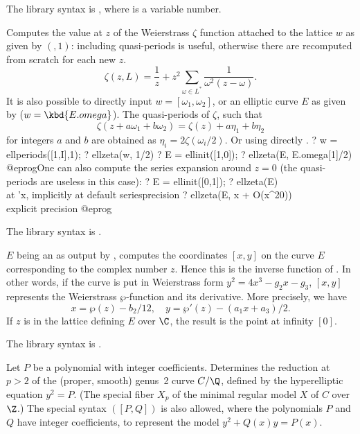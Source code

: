 The library syntax is , where  is a variable number.

\label{se:ellzeta}
Computes the value at $z$ of the Weierstrass $\zeta$ function attached to
the lattice $w$ as given by $(,1)$: including quasi-periods
is useful, otherwise there are recomputed from scratch for each new $z$.
$$ \zeta(z, L) = \dfrac{1}{z} + z^2\sum_{\omega\in L^*}
\dfrac{1}{\omega^2(z-\omega)}.$$
It is also possible to directly input $w = [\omega_1,\omega_2]$,
or an elliptic curve $E$ as given by  ($w = \kbd{E.omega}$).
The quasi-periods of $\zeta$, such that
$$\zeta(z + a\omega_1 + b\omega_2) = \zeta(z) + a\eta_1 + b\eta_2 $$
for integers $a$ and $b$ are obtained as $\eta_i = 2\zeta(\omega_i/2)$.
Or using directly .
\bprog
? w = ellperiods([1,I],1);
? ellzeta(w, 1/2)
? E = ellinit([1,0]);
? ellzeta(E, E.omega[1]/2)
@eprog\noindent One can also compute the series expansion around $z = 0$
(the quasi-periods are useless in this case):
\bprog
? E = ellinit([0,1]);
? ellzeta(E) \\ at 'x, implicitly at default seriesprecision
? ellzeta(E, x + O(x^20)) \\ explicit precision
@eprog\noindent

The library syntax is .

\label{se:ellztopoint}
$E$ being an  as output by
, computes the coordinates $[x,y]$ on the curve $E$
corresponding to the complex number $z$. Hence this is the inverse function
of . In other words, if the curve is put in Weierstrass
form $y^2 = 4x^3 - g_2x - g_3$, $[x,y]$ represents the Weierstrass
$\wp$-function and its derivative. More
precisely, we have
$$x = \wp(z) - b_2/12,\quad y = \wp'(z) - (a_1 x + a_3)/2.$$
If $z$ is in the lattice defining $E$ over $\C$, the result is the point at
infinity $[0]$.

The library syntax is .

\label{se:genus2red}
Let $P$ be a polynomial with integer coefficients.
Determines the reduction at $p > 2$ of the (proper, smooth) genus~2
curve $C/\Q$, defined by the hyperelliptic equation $y^2 = P$. (The
special fiber $X_p$ of the minimal regular model $X$ of $C$ over $\Z$.)
The special syntax $([P,Q])$ is also allowed, where the
polynomials $P$ and $Q$ have integer coefficients, to represent the model
$y^2 + Q(x)y = P(x)$.

